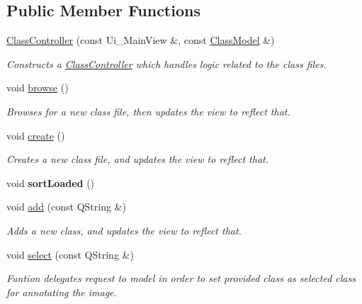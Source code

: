 \subsection*{Public Member Functions}
\begin{DoxyCompactItemize}
\item 
\hyperlink{classClassController_a6edb502072d6d3c5d7f1905ef4c7a81a}{Class\+Controller} (const Ui\+\_\+\+Main\+View \&, const \hyperlink{classClassModel}{Class\+Model} \&)
\begin{DoxyCompactList}\small\item\em Constructs a \hyperlink{classClassController}{Class\+Controller} which handles logic related to the class files. \end{DoxyCompactList}\item 
\mbox{\label{classClassController_a79b058a17a14de98aced16bbd7b00348}} 
void \hyperlink{classClassController_a79b058a17a14de98aced16bbd7b00348}{browse} ()
\begin{DoxyCompactList}\small\item\em Browses for a new class file, then updates the view to reflect that. \end{DoxyCompactList}\item 
\mbox{\label{classClassController_a334af2fa2b39883a1499947c7a623d23}} 
void \hyperlink{classClassController_a334af2fa2b39883a1499947c7a623d23}{create} ()
\begin{DoxyCompactList}\small\item\em Creates a new class file, and updates the view to reflect that. \end{DoxyCompactList}\item 
\mbox{\label{classClassController_aef5112f565abed11ca3eeab4cd9a58a4}} 
void {\bfseries sort\+Loaded} ()
\item 
void \hyperlink{classClassController_abd51fbe1d80458b68f2023742bb2723a}{add} (const Q\+String \&)
\begin{DoxyCompactList}\small\item\em Adds a new class, and updates the view to reflect that. \end{DoxyCompactList}\item 
void \hyperlink{classClassController_a98a04b6200241406efd95504a2f5fa29}{select} (const Q\+String \&)
\begin{DoxyCompactList}\small\item\em Funtion delegates request to model in order to set provided class as selected class for annotating the image. \end{DoxyCompactList}\item 

\end{DoxyCompactItemize}
